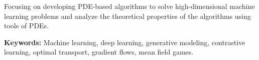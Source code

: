 

\begin{cvparagraph}


Focusing on developing PDE-based algorithms to solve high-dimensional machine learning problems and analyze the theoretical properties of the algorithms using tools of PDEs.

\textbf{Keywords:} Machine learning, deep learning, generative modeling, contrastive learning, optimal transport, gradient flows, mean field games.

\end{cvparagraph}